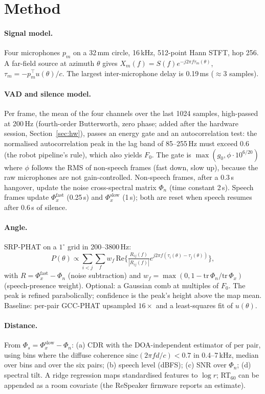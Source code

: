 \section{Method}

\paragraph{Signal model.} Four microphones $p_m$ on a 32\,mm circle, 16\,kHz,
512-point Hann STFT, hop 256. A far-field source at azimuth $\theta$ gives
$X_m(f)=S(f)e^{-j2\pi f\tau_m(\theta)}$, $\tau_m=-p_m^\top u(\theta)/c$. The
largest inter-microphone delay is 0.19\,ms ($\approx$3 samples).

\paragraph{VAD and silence model.} Per frame, the mean of the four
channels over the last 1024 samples, high-passed at 200\,Hz (fourth-order
Butterworth, zero phase; added after the hardware session,
Section~\ref{sec:hw}), passes an energy gate and an
autocorrelation test: the normalised autocorrelation peak in the lag band
of 85--255\,Hz must exceed 0.6 (the robot pipeline's rule), which also
yields $F_0$. The gate is $\max(g_0, \phi\cdot 10^{6/20})$ where $\phi$
follows the RMS of non-speech frames (fast down, slow up), because the raw
microphones are not gain-controlled. Non-speech frames, after a 0.3\,s
hangover, update the noise cross-spectral matrix $\Phi_n$ (time constant
2\,s). Speech frames update $\Phi_x^{\text{fast}}$ (0.25\,s) and
$\Phi_x^{\text{slow}}$ (1\,s); both are reset when speech resumes after
0.6\,s of silence.

\paragraph{Angle.} SRP-PHAT on a $1^\circ$ grid in 200--3800\,Hz:
\[
P(\theta)\propto\sum_{i<j}\sum_f w_f\,\mathrm{Re}\Big\{\tfrac{R_{ij}(f)}{|R_{ij}(f)|}
e^{j2\pi f(\tau_i(\theta)-\tau_j(\theta))}\Big\},
\]
with $R=\Phi_x^{\text{fast}}-\Phi_n$ (noise subtraction) and
$w_f=\max(0,1-\mathrm{tr}\,\Phi_n/\mathrm{tr}\,\Phi_x)$ (speech-presence
weight). Optional: a Gaussian comb at multiples of $F_0$. The peak is
refined parabolically; confidence is the peak's height above the map
mean. Baseline: per-pair GCC-PHAT upsampled $16\times$ and a least-squares
fit of $u(\theta)$.

\paragraph{Distance.} From $\Phi_s=\Phi_x^{\text{slow}}-\Phi_n$: (a) CDR
with the DOA-independent estimator of \cite{schwarz2015cdr} per pair,
using bins where the diffuse coherence $\mathrm{sinc}(2\pi fd/c)<0.7$ in
0.4--7\,kHz, median over bins and over the six pairs; (b) speech level
(dBFS); (c) SNR over $\Phi_n$; (d) spectral tilt. A ridge regression maps
standardised features to $\log r$; RT$_{60}$ can be appended as a room
covariate (the ReSpeaker firmware reports an estimate).

